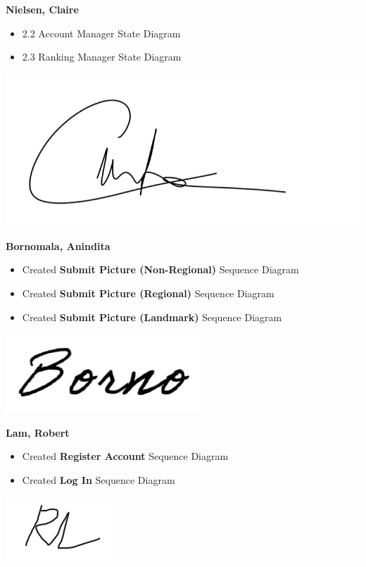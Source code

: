 \documentclass[]{article}
\begin{document}
\textbf{Nielsen, Claire}
\begin{itemize}
    \item 2.2 Account Manager State Diagram
    \item 2.3 Ranking Manager State Diagram
\end{itemize}
\includegraphics[scale=0.15]{clairesignature.jpg}

\textbf{Bornomala, Anindita}
\begin{itemize}
    \item Created \textbf{Submit Picture (Non-Regional)} Sequence Diagram
    \item Created \textbf{Submit Picture (Regional)} Sequence Diagram
    \item Created \textbf{Submit Picture (Landmark)} Sequence Diagram
\end{itemize}
\includegraphics[scale=0.50]{bornosignature.png}

\textbf{Lam, Robert}
\begin{itemize}
    \item Created \textbf{Register Account} Sequence Diagram
    \item Created \textbf{Log In} Sequence Diagram
\end{itemize}
\includegraphics[scale=1]{robertsignature.png}

\end{document}
